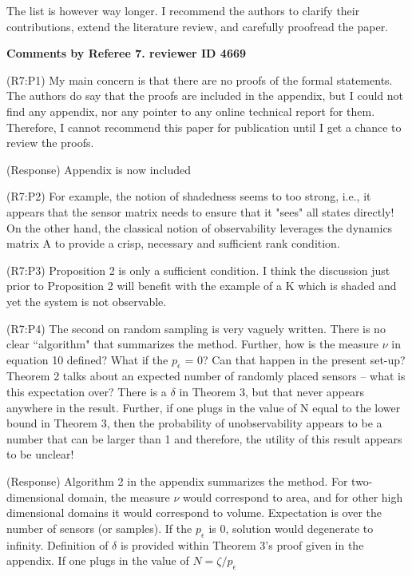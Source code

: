 \documentclass{letter}
\begin{document}
The list is however way longer. I recommend the authors to clarify
their contributions, extend the literature review, and carefully
proofread the paper. 


{\bf Comments by Referee 7. reviewer ID 4669}

{\color{red}(R7:P1)} My main concern is that there are no proofs of the formal
statements. The authors do say that the proofs are included in the
appendix, but I could not find any appendix, nor any pointer to any
online technical report for them. Therefore, I cannot recommend this
paper for publication until I get a chance to review the proofs.

{\color{red}(Response)} Appendix is now included

{\color{red}(R7:P2)} For example, the notion of shadedness seems to too strong, i.e., it appears
that the sensor matrix needs to ensure that it "sees" all states
directly! On the other hand, the classical notion of observability
leverages the dynamics matrix A to provide a crisp, necessary and
sufficient rank condition. 

{\color{red}(R7:P3)} Proposition 2 is only a sufficient condition. I think the discussion
just prior to Proposition 2 will benefit with the example of a K which
is shaded and yet the system is not observable.

{\color{red}(R7:P4)} The second on random sampling is very vaguely written. There is no
clear ``algorithm" that summarizes the method. Further, how is the
measure $ \nu $ in equation 10 defined? What if the $ p_\epsilon $ = 0? Can
that happen in the present set-up? Theorem 2 talks about an expected
number of randomly placed sensors -- what is this expectation over? There is a $ \delta $ in Theorem 3, but that never appears anywhere in the result. Further, if one plugs in the value of N equal to the lower bound in Theorem 3, then the probability of unobservability appears to
be a number that can be larger than 1 and therefore, the utility of
this result appears to be unclear!

{\color{red}(Response)}  Algorithm 2 in the appendix summarizes the method. For two-dimensional domain, the measure $ \nu $ would correspond to area, and for other high dimensional domains it would correspond to volume. Expectation is over the number of sensors (or samples). If the $ p_\epsilon $ is 0, solution would degenerate to infinity. Definition of $ \delta $ is provided  within Theorem 3's proof given in the appendix. If one plugs in the value of $ N = \zeta/p_\epsilon $
\end{document}
